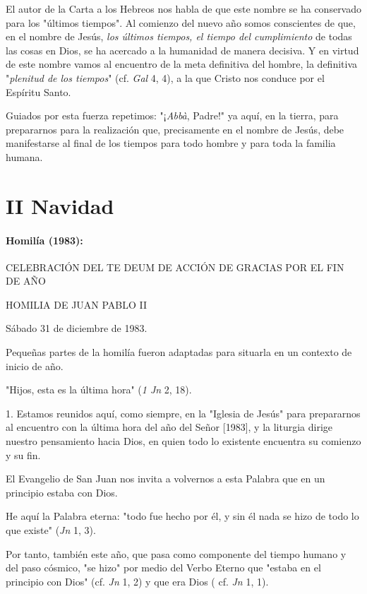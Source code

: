 \begin{body}
El autor de la Carta a los Hebreos nos habla de que este nombre se ha conservado para los "últimos tiempos". Al comienzo del nuevo año somos conscientes de que, en el nombre de Jesús, \emph{los últimos tiempos, el tiempo del cumplimiento} de todas las cosas en Dios, se ha acercado a la humanidad de manera decisiva. Y en virtud de este nombre vamos al encuentro de la meta definitiva del hombre, la definitiva "\emph{plenitud de los tiempos}" (cf. \emph{Gal} 4, 4), a la que Cristo nos conduce por el Espíritu Santo.

Guiados por esta fuerza repetimos: "¡\emph{Abbà}, Padre!" ya aquí, en la tierra, para prepararnos para la realización que, precisamente en el nombre de Jesús, debe manifestarse al final de los tiempos para todo hombre y para toda la familia humana.



\chapter{II Navidad}

\subsubsection{Homilía (1983): }

CELEBRACIÓN DEL TE DEUM DE ACCIÓN DE GRACIAS POR EL FIN DE AÑO

HOMILIA DE JUAN PABLO II

Sábado 31 de diciembre de 1983.

Pequeñas partes de la homilía fueron adaptadas para situarla en un contexto de inicio de año.

"Hijos, esta es la última hora" (\emph{1 Jn} 2, 18).

1. Estamos reunidos aquí, como siempre, en la "Iglesia de Jesús" para prepararnos al encuentro con la última hora del año del Señor {[}1983{]}, y la liturgia dirige nuestro pensamiento hacia Dios, en quien todo lo existente encuentra su comienzo y su fin.

El Evangelio de San Juan nos invita a volvernos a esta Palabra que en un principio estaba con Dios.

He aquí la Palabra eterna: "todo fue hecho por él, y sin él nada se hizo de todo lo que existe" (\emph{Jn} 1, 3).

Por tanto, también este año, que pasa como componente del tiempo humano y del paso cósmico, "se hizo" por medio del Verbo Eterno que "estaba en el principio con Dios" (cf. \emph{Jn} 1, 2) y que era Dios ( cf. \emph{Jn} 1, 1).


\end{body}
